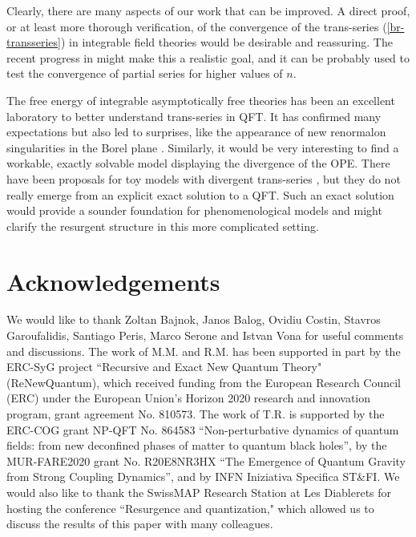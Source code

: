 \documentclass[a4paper,11pt]{article}
\theoremstyle{definition}
\begin{document}
Clearly, there are many aspects of our work that can be improved. A direct proof, or at least more thorough verification, 
of the convergence of the trans-series (\ref{br-transseries}) in integrable field theories would be desirable and reassuring. 
The recent progress in \cite{bbv2} might make this a realistic goal, and it can be probably used to test the convergence 
of partial series for higher values of $n$. 

The free energy of integrable asymptotically free theories has been an excellent 
laboratory to better understand trans-series in QFT. It has confirmed many expectations 
but also led to surprises, like the appearance of new renormalon 
singularities in the Borel plane \cite{mmr-an}. Similarly, it would be very 
interesting to find a workable, exactly solvable model displaying the divergence of the OPE. There have been 
proposals for toy models with divergent trans-series \cite{shifman, shifman-hadrons, peris}, 
but they do not really emerge from an explicit exact solution to a QFT. Such an exact solution 
would provide  a sounder foundation for phenomenological models and might clarify the resurgent structure in this more complicated setting. 



\section*{Acknowledgements}
We would like to thank Zoltan Bajnok, Janos Balog, Ovidiu Costin, 
Stavros Garoufalidis, Santiago Peris, Marco Serone and Istvan Vona for useful comments 
and discussions. The work of M.M. and R.M. has been supported in part by the ERC-SyG project 
``Recursive and Exact New Quantum Theory" (ReNewQuantum), which 
received funding from the European Research Council (ERC) under the European 
Union's Horizon 2020 research and innovation program, 
grant agreement No. 810573. 
The work of T.R. is supported by the ERC-COG grant NP-QFT No. 864583
“Non-perturbative dynamics of quantum fields: from new deconfined
phases of matter to quantum black holes”, by the MUR-FARE2020 grant
No. R20E8NR3HX “The Emergence of Quantum Gravity from Strong Coupling
Dynamics”,
and by INFN Iniziativa Specifica ST\&FI. 
We would also like to thank the SwissMAP Research Station at Les Diablerets for hosting the conference 
``Resurgence and quantization," which allowed us to discuss the results of this paper with many colleagues. 






\end{document}

